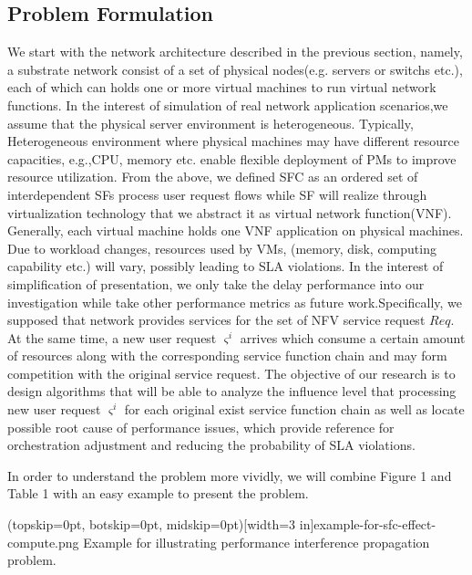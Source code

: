 \documentclass{ieeeaccess}
\begin{document}
\subsection{Problem Formulation}
We start with the network architecture described in the previous section, namely, a substrate network consist of a set of physical nodes(e.g. servers or switchs etc.), each of which can holds one or more virtual machines to run virtual network functions. In the interest of simulation of real network application scenarios,we assume that the physical server environment is heterogeneous. Typically, Heterogeneous environment where physical machines may have different resource capacities, e.g.,CPU, memory etc. enable flexible deployment of PMs to improve resource utilization. From the above, we defined SFC as an ordered set of interdependent SFs process user request flows while SF will realize through virtualization technology that we abstract it as virtual network function(VNF). Generally, each virtual machine holds one VNF application on physical machines. Due to workload changes, resources used by VMs, (memory, disk, computing capability etc.) will vary, possibly leading to SLA violations. In the interest of simplification of presentation, we only take the delay performance into our investigation while take other performance metrics as future work.Specifically, we supposed that network provides services for the set of NFV service request  $Req$. At the same time, a new user request  ${\varsigma}^{i}$  arrives which consume a certain amount of resources along with the corresponding service function chain and may form competition with the original service request. The objective of our research is to design algorithms that will be able to analyze the influence level that processing new user request ${\varsigma}^{i}$  for each original exist service function chain as well as locate possible root cause of performance issues, which provide reference for orchestration adjustment and reducing the probability of SLA violations.

In order to understand the problem more vividly, we will combine Figure 1 and Table 1 with an easy example to present the problem.

\Figure[t!](topskip=0pt, botskip=0pt, midskip=0pt)[width=3 in]{example-for-sfc-effect-compute.png}
{Example for illustrating performance interference propagation problem.\label{fig1}}
\end{document}
